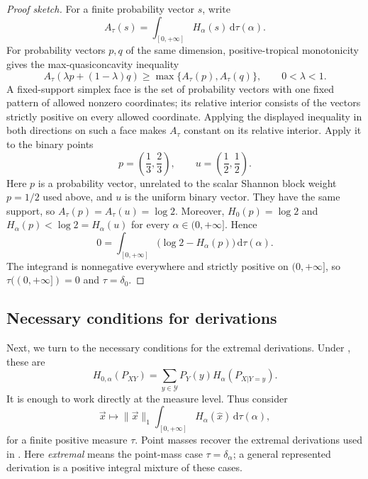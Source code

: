 \documentclass[aps,pra,11pt,onecolumn,nofootinbib,tightenlines]{revtex4-2}
\theoremstyle{definition}
\def \d {\mathrm{d}}
\newcommand{\Y}{\mathcal{Y}}
\begin{document}
\begin{proof}[Proof sketch]
For a finite probability vector $s$, write
\begin{equation}
A_\tau(s)=\int_{[0,+\infty]}H_\alpha(s)\,\d\tau(\alpha).
\label{eq:concise-positive-tropical-integrated-entropy}
\end{equation}
For probability vectors $p,q$ of the same dimension, positive-tropical
monotonicity gives the max-quasiconcavity inequality
\begin{equation}
A_\tau(\lambda p+(1-\lambda)q)
\geq\max\{A_\tau(p),A_\tau(q)\},
\qquad 0<\lambda<1.
\label{eq:concise-strong-max-quasiconcavity}
\end{equation}
A fixed-support simplex face is the set of probability vectors with one fixed
pattern of allowed nonzero coordinates; its relative interior consists of
the vectors strictly positive on every allowed coordinate.  Applying the
displayed inequality in both directions on such a face makes $A_\tau$ constant
on its relative interior.  Apply it to the binary points
\[
p=\left(\frac13,\frac23\right),
\qquad
u=\left(\frac12,\frac12\right).
\]
Here $p$ is a probability vector, unrelated to the scalar Shannon block weight
$p=1/2$ used above, and $u$ is the uniform binary vector.
They have the same support, so $A_\tau(p)=A_\tau(u)=\log2$.  Moreover,
$H_0(p)=\log2$ and $H_\alpha(p)<\log2=H_\alpha(u)$ for every
$\alpha\in(0,+\infty]$.  Hence
\begin{equation}
0=\int_{[0,+\infty]}
\bigl(\log2-H_\alpha(p)\bigr)\,\d\tau(\alpha).
\label{eq:concise-positive-tropical-zero-gap}
\end{equation}
The integrand is nonnegative everywhere and strictly positive on
$(0,+\infty]$, so $\tau((0,+\infty])=0$ and $\tau=\delta_0$.
\end{proof}

\subsection{Necessary conditions for derivations}
\label{sec:necessary-derivations}

Next, we turn to the necessary conditions for the extremal derivations.  Under
\ParameterMainDerivationRepresentation, these are
\begin{equation}
H_{0,\alpha}(P_{XY})=
\sum_{y\in\Y}P_Y(y)H_\alpha(P_{X|Y=y}).
\end{equation}
It is enough to work directly at the measure level.  Thus consider
\begin{equation}
\vec{x}\longmapsto\|\vec{x}\|_1
\int_{[0,+\infty]}H_\alpha(\hat{x})\,\d\tau(\alpha),
\end{equation}
for a finite positive measure $\tau$.  Point masses recover the extremal
derivations used in \ParameterMainDerivationLift.
Here \emph{extremal} means the point-mass case $\tau=\delta_\alpha$; a general
represented derivation is a positive integral mixture of these cases.
\end{document}
